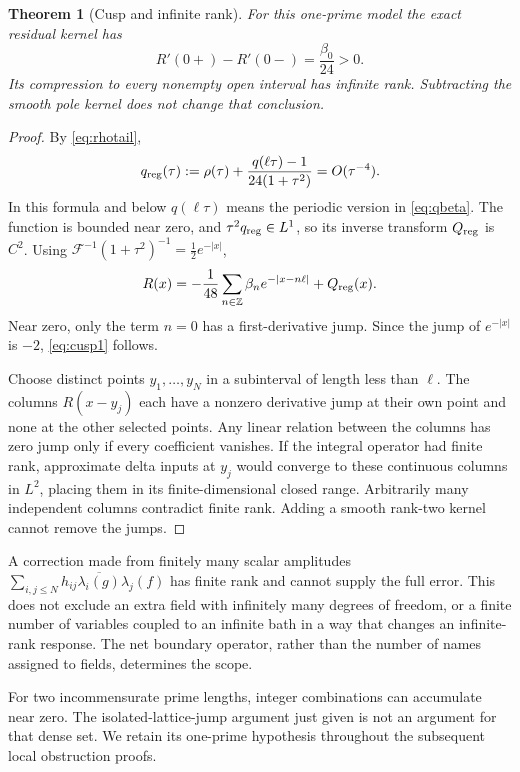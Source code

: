 \documentclass[11pt]{article}
\numberwithin{equation}{section}
\newtheorem{theorem}{Theorem}[section]
\theoremstyle{definition}
\theoremstyle{remark}
\begin{document}
\begin{theorem}[Cusp and infinite rank]
For this one-prime model the exact residual kernel has
\begin{equation}
 R'(0+)-R'(0-)=\frac{\beta_0}{24}>0.
 \label{eq:cusp1}
\end{equation}
Its compression to every nonempty open interval has infinite rank. Subtracting the smooth pole kernel does not change that conclusion.
\end{theorem}
\begin{proof}
By \eqref{eq:rhotail},
\begin{equation}
 q_{\rm reg}(\tau):=\rho(\tau)+
 \frac{q(\ell\tau)-1}{24(1+\tau^2)}=O(\tau^{-4}).
\end{equation}
In this formula and below $q(\ell\tau)$ means the periodic version in \eqref{eq:qbeta}. The function is bounded near zero, and $\tau^2q_{\rm reg}\in L^1$, so its inverse transform $Q_{\rm reg}$ is $C^2$. Using $\mathcal F^{-1}(1+\tau^2)^{-1}=\tfrac12e^{-|x|}$,
\begin{equation}
 R(x)=-\frac1{48}\sum_{n\in\mathbb Z}\beta_ne^{-|x-n\ell|}
       +Q_{\rm reg}(x).
 \label{eq:cuspdecomp}
\end{equation}
Near zero, only the term $n=0$ has a first-derivative jump. Since the jump of $e^{-|x|}$ is $-2$, \eqref{eq:cusp1} follows.

Choose distinct points $y_1,\ldots,y_N$ in a subinterval of length less than $\ell$. The columns $R(x-y_j)$ each have a nonzero derivative jump at their own point and none at the other selected points. Any linear relation between the columns has zero jump only if every coefficient vanishes. If the integral operator had finite rank, approximate delta inputs at $y_j$ would converge to these continuous columns in $L^2$, placing them in its finite-dimensional closed range. Arbitrarily many independent columns contradict finite rank. Adding a smooth rank-two kernel cannot remove the jumps.
\end{proof}
A correction made from finitely many scalar amplitudes
$\sum_{i,j\le N}h_{ij}\overline{\lambda_i(g)}\lambda_j(f)$ has finite rank and cannot supply the full error. This does not exclude an extra field with infinitely many degrees of freedom, or a finite number of variables coupled to an infinite bath in a way that changes an infinite-rank response. The net boundary operator, rather than the number of names assigned to fields, determines the scope.

For two incommensurate prime lengths, integer combinations can accumulate near zero. The isolated-lattice-jump argument just given is not an argument for that dense set. We retain its one-prime hypothesis throughout the subsequent local obstruction proofs.
\end{document}
